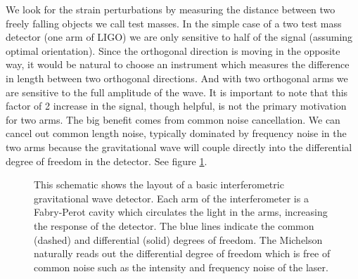 We look for the strain perturbations by measuring the distance between two
freely falling objects we call test masses.
In the simple case of a two test mass detector (one arm of LIGO) we are only
sensitive to half of the signal (assuming optimal orientation).
Since the orthogonal direction is moving in the opposite way, it would be
natural to choose an instrument which measures the difference in length between
two orthogonal directions.
And with two orthogonal arms we are sensitive to the full
amplitude of the wave.
It is important to note that this factor of 2 increase in the signal, though
helpful, is not the primary motivation for two arms. 
The big benefit comes from common noise cancellation.
We can cancel out common length noise,
typically dominated by frequency noise
in the two arms because the gravitational
wave will couple directly into the differential degree of freedom in the
detector.
See figure \ref{fig:ligoschematic}.

\begin{figure}
\centering
{}
\caption[LIGO Schematic]{This schematic shows the layout of a basic
    interferometric gravitational wave detector.
    Each arm of the interferometer is a Fabry-Perot cavity which circulates
    the light in the arms, increasing the response of the detector.
    The blue lines indicate the common (dashed) and differential (solid)
    degrees of freedom.
    The Michelson naturally reads out the differential degree of freedom which
    is free of common noise such as the intensity and frequency noise of the
    laser.
    }
\label{fig:ligoschematic}
\end{figure}


